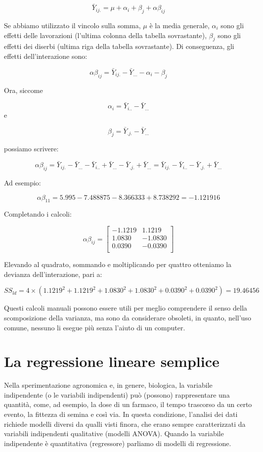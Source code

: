 \documentclass[a4paper,12pt,oneside]{book}
\begin{document}
\[ \bar{Y}_{ij.} = \mu + \alpha_i + \beta_j + \alpha\beta_{ij}\]

Se abbiamo utilizzato il vincolo sulla somma, \(\mu\) è la media generale, \(\alpha_i\) sono gli effetti delle lavorazioni (l'ultima colonna della tabella sovrastante), \(\beta_j\) sono gli effetti dei diserbi (ultima riga della tabella sovrastante). Di conseguenza, gli effetti dell'interazione sono:

\[ \alpha\beta_{ij} = \bar{Y}_{ij.} - \bar{Y}_{...} - \alpha_i - \beta_j \]

Ora, siccome

\[\alpha_i = \bar{Y}_{i..} - \bar{Y}_{...}\]
e

\[\beta_j = \bar{Y}_{.j.} - \bar{Y}_{...}\]

possiamo scrivere:

\[ \alpha\beta_{ij} = \bar{Y}_{ij.} - \bar{Y}_{...} - \bar{Y}_{i..} + \bar{Y}_{...} - \bar{Y}_{.j.} + \bar{Y}_{...} = \bar{Y}_{ij.} - \bar{Y}_{i..} - \bar{Y}_{.j.} + \bar{Y}_{...}\]

Ad esempio:

\[ \alpha\beta_{11} = 5.995 - 7.488875 - 8.366333 + 8.738292 = - 1.121916\]

Completando i calcoli:

\[ \alpha\beta_{ij} = \left[ {\begin{array}{rr}
-1.1219 &  1.1219 \\
1.0830 & -1.0830 \\
0.0390 & -0.0390\\
\end{array}} \right]\]

Elevando al quadrato, sommando e moltiplicando per quattro otteniamo la devianza dell'interazione, pari a:

\[ SS_{ld} = 4 \times \left(1.1219^2+ 1.1219^2 +1.0830^2 +1.0830^2 + 0.0390^2 +0.0390^2 \right)= 19.46456\]

Questi calcoli manuali possono essere utili per meglio comprendere il senso della scomposizione della varianza, ma sono da considerare obsoleti, in quanto, nell'uso comune, nessuno li esegue più senza l'aiuto di un computer.

\hypertarget{la-regressione-lineare-semplice}{%
\chapter{La regressione lineare semplice}\label{la-regressione-lineare-semplice}}

Nella sperimentazione agronomica e, in genere, biologica, la variabile indipendente (o le variabili indipendenti) può (possono) rappresentare una quantità, come, ad esempio, la dose di un farmaco, il tempo trascorso da un certo evento, la fittezza di semina e così via. In questa condizione, l'analisi dei dati richiede modelli diversi da qualli visti finora, che erano sempre caratterizzati da variabili indipendenti qualitative (modelli ANOVA). Quando la variabile indipendente è quantitativa (regressore) parliamo di modelli di regressione.
\end{document}

